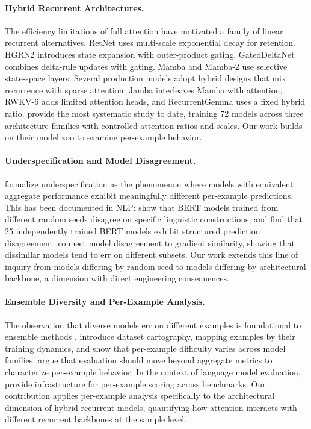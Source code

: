 \documentclass[11pt,a4paper]{article}
\begin{document}
\paragraph{Hybrid Recurrent Architectures.}
The efficiency limitations of full attention \citep{vaswani2017attention} have motivated a family of linear recurrent alternatives. RetNet \citep{sun2023retnet} uses multi-scale exponential decay for retention. HGRN2 \citep{qin2024hgrn2} introduces state expansion with outer-product gating. GatedDeltaNet \citep{yang2024gated} combines delta-rule updates with gating. Mamba and Mamba-2 \citep{gu2024mamba, dao2024mamba2} use selective state-space layers. Several production models adopt hybrid designs that mix recurrence with sparse attention: Jamba \citep{lieber2024jamba} interleaves Mamba with attention, RWKV-6 \citep{peng2024rwkv} adds limited attention heads, and RecurrentGemma \citep{de2024recurrentgemma} uses a fixed hybrid ratio. \citet{wang2025mamba} provide the most systematic study to date, training 72 models across three architecture families with controlled attention ratios and scales. Our work builds on their model zoo to examine per-example behavior.

\paragraph{Underspecification and Model Disagreement.}
\citet{damour2022underspecification} formalize underspecification as the phenomenon where models with equivalent aggregate performance exhibit meaningfully different per-example predictions. This has been documented in NLP: \citet{mccoy2020berts} show that BERT models trained from different random seeds disagree on specific linguistic constructions, and \citet{sellam2022multiberts} find that 25 independently trained BERT models exhibit structured prediction disagreement. \citet{fort2019stiffness} connect model disagreement to gradient similarity, showing that dissimilar models tend to err on different subsets. Our work extends this line of inquiry from models differing by random seed to models differing by architectural backbone, a dimension with direct engineering consequences.

\paragraph{Ensemble Diversity and Per-Example Analysis.}
The observation that diverse models err on different examples is foundational to ensemble methods \citep{krogh1995neural, kuncheva2003measures}. \citet{swayamdipta2020dataset} introduce dataset cartography, mapping examples by their training dynamics, and show that per-example difficulty varies across model families. \citet{rodriguez2021evaluation} argue that evaluation should move beyond aggregate metrics to characterize per-example behavior. In the context of language model evaluation, \citet{gao2023framework} provide infrastructure for per-example scoring across benchmarks. Our contribution applies per-example analysis specifically to the architectural dimension of hybrid recurrent models, quantifying how attention interacts with different recurrent backbones at the sample level.
\end{document}
